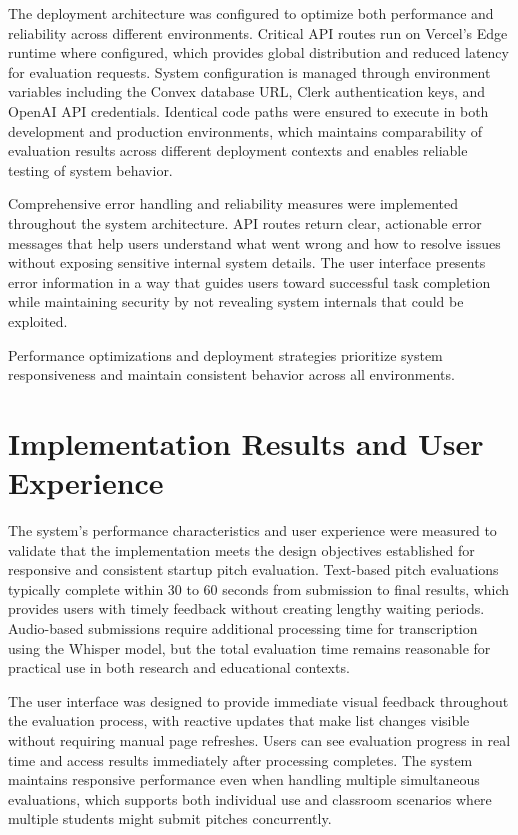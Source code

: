 The deployment architecture was configured to optimize both performance and reliability across different environments. Critical API routes run on Vercel's Edge runtime where configured, which provides global distribution and reduced latency for evaluation requests. System configuration is managed through environment variables including the Convex database URL, Clerk authentication keys, and OpenAI API credentials. Identical code paths were ensured to execute in both development and production environments, which maintains comparability of evaluation results across different deployment contexts and enables reliable testing of system behavior.

Comprehensive error handling and reliability measures were implemented throughout the system architecture. API routes return clear, actionable error messages that help users understand what went wrong and how to resolve issues without exposing sensitive internal system details. The user interface presents error information in a way that guides users toward successful task completion while maintaining security by not revealing system internals that could be exploited.

Performance optimizations and deployment strategies prioritize system responsiveness and maintain consistent behavior across all environments.

\section{Implementation Results and User Experience}\label{sec:results}

The system's performance characteristics and user experience were measured to validate that the implementation meets the design objectives established for responsive and consistent startup pitch evaluation. Text-based pitch evaluations typically complete within 30 to 60 seconds from submission to final results, which provides users with timely feedback without creating lengthy waiting periods. Audio-based submissions require additional processing time for transcription using the Whisper model, but the total evaluation time remains reasonable for practical use in both research and educational contexts.

The user interface was designed to provide immediate visual feedback throughout the evaluation process, with reactive updates that make list changes visible without requiring manual page refreshes. Users can see evaluation progress in real time and access results immediately after processing completes. The system maintains responsive performance even when handling multiple simultaneous evaluations, which supports both individual use and classroom scenarios where multiple students might submit pitches concurrently.

